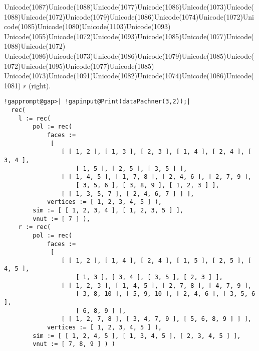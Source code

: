 \documentclass[a4paper,11pt]{report}
\begin{document}
{{{Unicode(1087)Unicode(1088)Unicode(1077)Unicode(1086)Unicode(1073)Unicode(1088)Unicode(1072)Unicode(1079)Unicode(1086)Unicode(1074)Unicode(1072)Unicode(1085)Unicode(1080)Unicode(1103)Unicode(1093)
Unicode(1055)Unicode(1072)Unicode(1093)Unicode(1085)Unicode(1077)Unicode(1088)Unicode(1072)
Unicode(1086)Unicode(1073)Unicode(1086)Unicode(1079)Unicode(1085)Unicode(1072)Unicode(1095)Unicode(1077)Unicode(1085)
Unicode(1073)Unicode(1091)Unicode(1082)Unicode(1074)Unicode(1086)Unicode(1081) $r$ (right). 
\begin{Verbatim}[commandchars=!@|,fontsize=\small,frame=single,label=Пример]
  !gapprompt@gap>| !gapinput@Print(dataPachner(3,2));|
  rec(
    l := rec(
        pol := rec(
            faces :=
             [
                [ [ 1, 2 ], [ 1, 3 ], [ 2, 3 ], [ 1, 4 ], [ 2, 4 ], [ 3, 4 ],
                    [ 1, 5 ], [ 2, 5 ], [ 3, 5 ] ],
                [ [ 1, 4, 5 ], [ 1, 7, 8 ], [ 2, 4, 6 ], [ 2, 7, 9 ],
                    [ 3, 5, 6 ], [ 3, 8, 9 ], [ 1, 2, 3 ] ],
                [ [ 1, 3, 5, 7 ], [ 2, 4, 6, 7 ] ] ],
            vertices := [ 1, 2, 3, 4, 5 ] ),
        sim := [ [ 1, 2, 3, 4 ], [ 1, 2, 3, 5 ] ],
        vnut := [ 7 ] ),
    r := rec(
        pol := rec(
            faces :=
             [
                [ [ 1, 2 ], [ 1, 4 ], [ 2, 4 ], [ 1, 5 ], [ 2, 5 ], [ 4, 5 ],
                    [ 1, 3 ], [ 3, 4 ], [ 3, 5 ], [ 2, 3 ] ],
                [ [ 1, 2, 3 ], [ 1, 4, 5 ], [ 2, 7, 8 ], [ 4, 7, 9 ],
                    [ 3, 8, 10 ], [ 5, 9, 10 ], [ 2, 4, 6 ], [ 3, 5, 6 ],
                    [ 6, 8, 9 ] ],
                [ [ 1, 2, 7, 8 ], [ 3, 4, 7, 9 ], [ 5, 6, 8, 9 ] ] ],
            vertices := [ 1, 2, 3, 4, 5 ] ),
        sim := [ [ 1, 2, 4, 5 ], [ 1, 3, 4, 5 ], [ 2, 3, 4, 5 ] ],
        vnut := [ 7, 8, 9 ] ) )
    						

\end{Verbatim}}}}
\end{document}
